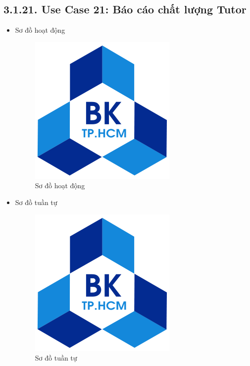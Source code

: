 \subsection*{3.1.21. Use Case 21: Báo cáo chất lượng Tutor}
\begin{itemize}
    \item Sơ đồ hoạt động
    \begin{figure}[H]
    \centering
    \includegraphics[scale=0.5 ]{Picture/hcmut.png}
    \caption{Sơ đồ hoạt động }
    \end{figure}
    \item Sơ đồ tuần tự
    \begin{figure}[H]
    \centering
    \includegraphics[scale=0.5 ]{Picture/hcmut.png}
    \caption{Sơ đồ tuần tự }
    \end{figure}
\end{itemize}
